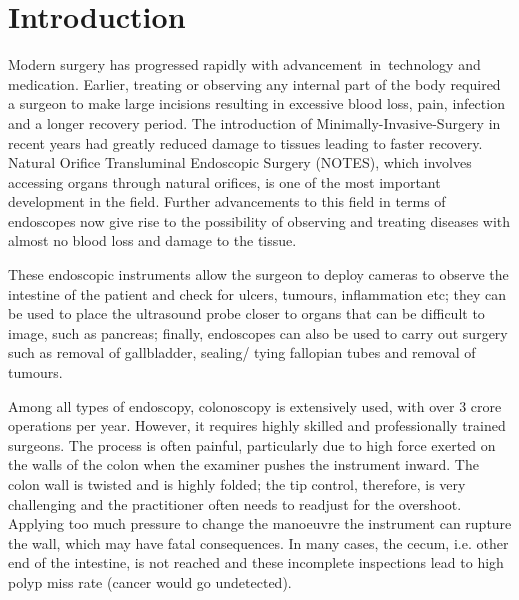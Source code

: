 \documentclass[12pt]{report}
\begin{document}




\newpage

\vspace{\baselineskip}\section*{Introduction}
Modern surgery has progressed rapidly with advancement\ in\ technology and medication.  Earlier, treating or observing any internal part of the body required a surgeon to make large incisions resulting in excessive blood loss, pain, infection and a longer recovery period.  The introduction of Minimally-Invasive-Surgery in recent years had greatly reduced damage to tissues leading to faster recovery. Natural Orifice Transluminal Endoscopic Surgery (NOTES), which involves accessing organs through natural orifices, is one of the most important development in the field. Further advancements to this field in terms of endoscopes now give rise to the possibility of observing and treating diseases with almost no blood loss and damage to the tissue. \par

These endoscopic instruments allow the surgeon to deploy cameras to observe the intestine of the patient and check for ulcers, tumours, inflammation etc; they can be used to place the ultrasound probe closer to organs that can be difficult to image, such as pancreas; finally, endoscopes can also be used to carry out surgery such as removal of gallbladder, sealing/ tying fallopian tubes and removal of tumours.\par

Among all types of endoscopy, colonoscopy is extensively used, with over 3 crore operations per year. However, it requires highly skilled and professionally trained surgeons. The process is often painful, particularly due to high force exerted on the walls of the colon when the examiner pushes the instrument inward. The colon wall is twisted and is highly folded; the tip control, therefore, is very challenging and the practitioner often needs to readjust for the overshoot. Applying too much pressure to change the manoeuvre the instrument can rupture the wall, which may have fatal consequences. In many cases, the cecum, i.e. other end of the intestine, is not reached and these incomplete inspections lead to high polyp miss rate (cancer would go undetected).\par
\end{document}
